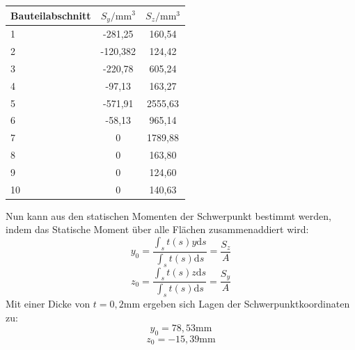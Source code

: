 \begin{center}
\begin{tabular}[h]{l|c|c}
	
Bauteilabschnitt&$S_{y}/\mathrm{mm}^3$&$S_{z}/\mathrm{mm}^3$\\
\hline
1& -281,25&160,54\\
2&-120,382&124,42\\
3&-220,78&605,24\\
4&-97,13&163,27\\
5&-571,91&2555,63\\
6&-58,13&965,14\\
7&0&1789,88\\
8&0&163,80\\
9&0&124,60\\
10&0&140,63\\
\end{tabular}
\end{center}

\noindent Nun kann aus den statischen Momenten der Schwerpunkt bestimmt werden, indem das Statische Moment über alle Flächen zusammenaddiert wird:
\begin{equation}
	y_{0}=\frac{\int_{s}{}t(s)y\mathrm{d}s}{\int_{s}{}t(s)\mathrm{d}s}=\frac{S_{z}}{A}
\end{equation}
\begin{equation}
	z_{0}=\frac{\int_{s}{}t(s)z\mathrm{d}s}{\int_{s}{}t(s)\mathrm{d}s}=\frac{S_{y}}{A}
\end{equation}
Mit einer Dicke von $t=0,2\mathrm{mm}$ ergeben sich Lagen der Schwerpunktkoordinaten zu:
$$
	y_{0}=78,53\mathrm{mm}
$$
$$
	z_{0}=-15,39\mathrm{mm}
$$


